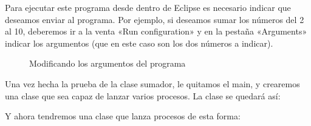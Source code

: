 \documentclass[letterpaper,10pt,spanish]{sphinxmanual}
\begin{document}
Para ejecutar este programa desde dentro de Eclipse es necesario indicar que deseamos enviar  al programa. Por ejemplo, si deseamos sumar los números del 2 al 10, deberemos ir a la venta «Run configuration» y en la pestaña «Arguments» indicar los argumentos (que en este caso son los dos números a indicar).

\begin{figure}[htbp]
\centering
\capstart

\noindent{}
\caption{Modificando los argumentos del programa}\label{\detokenize{textos/tema1:id1}}\end{figure}

Una vez hecha la prueba de la clase sumador, le quitamos el main, y crearemos una clase que sea capaz de lanzar varios procesos. La clase  se quedará así:

%
\begin{sphinxVerbatim}[commandchars=\\\{\}]
   
             
                 
                  
                 
\end{sphinxVerbatim}

Y ahora tendremos una clase que lanza procesos de esta forma:
\end{document}
